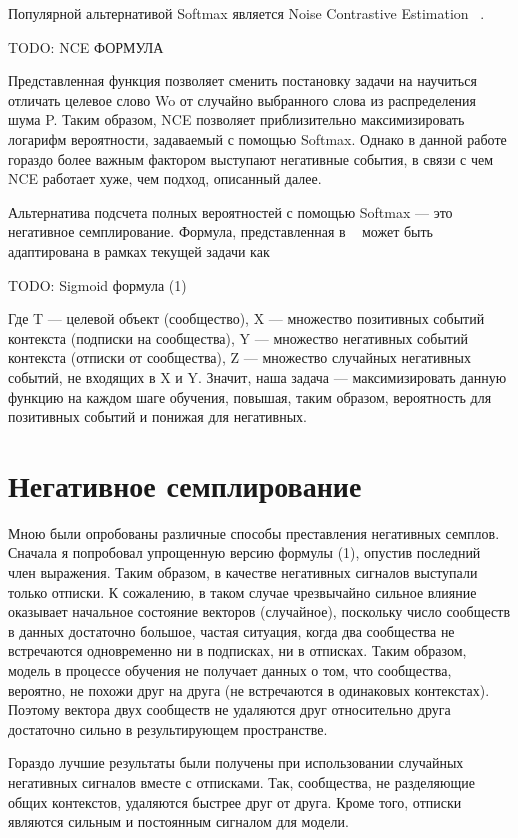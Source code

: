 \documentclass[times,specification,annotation]{itmo-student-thesis}
\begin{document}
Популярной альтернативой Softmax является Noise Contrastive Estimation ~\cite{mikolov2013distributed}.

TODO: NCE ФОРМУЛА

Представленная функция позволяет сменить постановку задачи на научиться
отличать целевое слово Wo от случайно выбранного слова из распределения шума
P. Таким образом, NCE позволяет приблизительно максимизировать логарифм
вероятности, задаваемый с помощью Softmax. Однако в данной работе гораздо
более важным фактором выступают негативные события, в связи с чем NCE
работает хуже, чем подход, описанный далее.

Альтернатива подсчета полных вероятностей с помощью Softmax — это
негативное семплирование. Формула, представленная в ~\cite{airbnb} может быть
адаптирована в рамках текущей задачи как

TODO: Sigmoid формула (1)

Где T — целевой объект (сообщество), X — множество позитивных событий
контекста (подписки на сообщества), Y — множество негативных событий
контекста (отписки от сообщества), Z — множество случайных негативных
событий, не входящих в X и Y. Значит, наша задача — максимизировать данную
функцию на каждом шаге обучения, повышая, таким образом, вероятность для
позитивных событий и понижая для негативных.

\section{Негативное семплирование}
Мною были опробованы различные способы преставления негативных
семплов. Сначала я попробовал упрощенную версию формулы (1), опустив
последний член выражения. Таким образом, в качестве негативных сигналов
выступали только отписки. К сожалению, в таком случае чрезвычайно сильное
влияние оказывает начальное состояние векторов (случайное), поскольку число
сообществ в данных достаточно большое, частая ситуация, когда два сообщества
не встречаются одновременно ни в подписках, ни в отписках. Таким образом,
модель в процессе обучения не получает данных о том, что сообщества, вероятно,
не похожи друг на друга (не встречаются в одинаковых контекстах). Поэтому
вектора двух сообществ не удаляются друг относительно друга достаточно сильно
в результирующем пространстве.

Гораздо лучшие результаты были получены при использовании случайных
негативных сигналов вместе с отписками. Так, сообщества, не разделяющие общих
контекстов, удаляются быстрее друг от друга. Кроме того, отписки являются
сильным и постоянным сигналом для модели.
\end{document}
